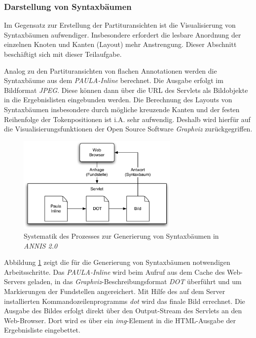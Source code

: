 \subsubsection{Darstellung von Syntaxbäumen}\label{sec:Darstellung.Syntaxbäume}

Im Gegensatz zur Erstellung der Partituransichten ist die Visualisierung von Syntaxbäumen aufwendiger. Insbesondere erfordert die lesbare Anordnung der einzelnen Knoten und Kanten (Layout) mehr Anstrengung. Dieser Abschnitt beschäftigt sich mit dieser Teilaufgabe.

Analog zu den Partituransichten von flachen Annotationen werden die Syntaxbäume aus dem \emph{PAULA-Inline} berechnet. Die Ausgabe erfolgt im Bildformat \emph{JPEG}. Diese können dann über die URL des Servlets als Bildobjekte in die Ergebnislisten eingebunden werden. Die Berechnung des Layouts von Syntaxbäumen insbesondere durch mögliche kreuzende Kanten und der festen Reihenfolge der Tokenpositionen ist i.A. sehr aufwendig. Deshalb wird hierfür auf die Visualisierungsfunktionen der Open Source Software \emph{Graphviz} \citep{ellson2001graphviz} zurückgegriffen.

\begin{figure}[H]
	\centering
	\includegraphics*[width=0.70\textwidth]{figures/DA/GraphvizProzess.pdf}
	\caption{Systematik des Prozesses zur Generierung von Syntaxbäumen in \emph{ANNIS 2.0}}\label{fig:GraphvizProzess}
\end{figure}

Abbildung \ref{fig:GraphvizProzess} zeigt die für die Generierung von Syntaxbäumen notwendigen Arbeitsschritte. Das \emph{PAULA-Inline} wird beim Aufruf aus dem Cache des Web-Servers geladen, in das \emph{Graphviz}-Beschreibungsformat \emph{DOT} überführt und um Markierungen der Fundstellen angereichert. Mit Hilfe des auf dem Server installierten Kommandozeilenprogramms \emph{dot} wird das finale Bild errechnet. Die Ausgabe des Bildes erfolgt direkt über den Output-Stream des Servlets an den Web-Browser. Dort wird es über ein \emph{img}-Element in die HTML-Ausgabe der Ergebnisliste eingebettet.

